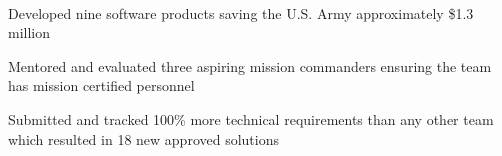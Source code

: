 \documentclass[]{resume}
\begin{document}
\begin{minipage}[t]{0.69\textwidth}
 \\
\begin{tightemize}
\item Developed nine software products saving the U.S. Army approximately \$1.3 million
\item Mentored and evaluated three aspiring mission commanders ensuring the team has mission certified personnel
\item Submitted and tracked 100\% more technical requirements than any other team which resulted in 18 new approved solutions
\end{tightemize}

\sectionsep



\end{minipage}
\end{document}
